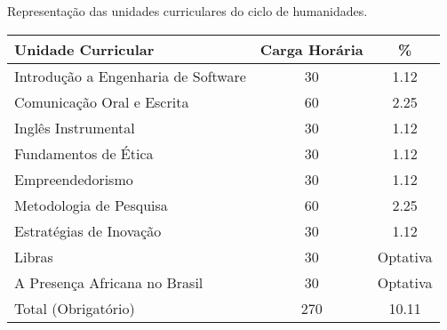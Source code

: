 \begin{quadro}[ht!]
\caption{Representação das unidades curriculares do ciclo de humanidades.}
\label{quad:humanities}
\centering
\begin{tabular}{|l|c|c|}
\hline
\rowcolor{blue1}
 Unidade Curricular &    Carga Horária  & \%\\
\hline
Introdução a Engenharia de Software & 30 & 1.12 \\
Comunicação Oral e Escrita & 60 & 2.25 \\
Inglês Instrumental & 30 & 1.12 \\
Fundamentos de Ética & 30 & 1.12 \\
Empreendedorismo & 30 & 1.12 \\
Metodologia de Pesquisa & 60 & 2.25 \\
Estratégias de Inovação & 30 & 1.12 \\
\hline
Libras & 30 & Optativa \\
A Presença Africana no Brasil & 30 & Optativa \\
\hline
Total (Obrigatório) & 270 & 10.11\\
\hline
\end{tabular}
\end{quadro}